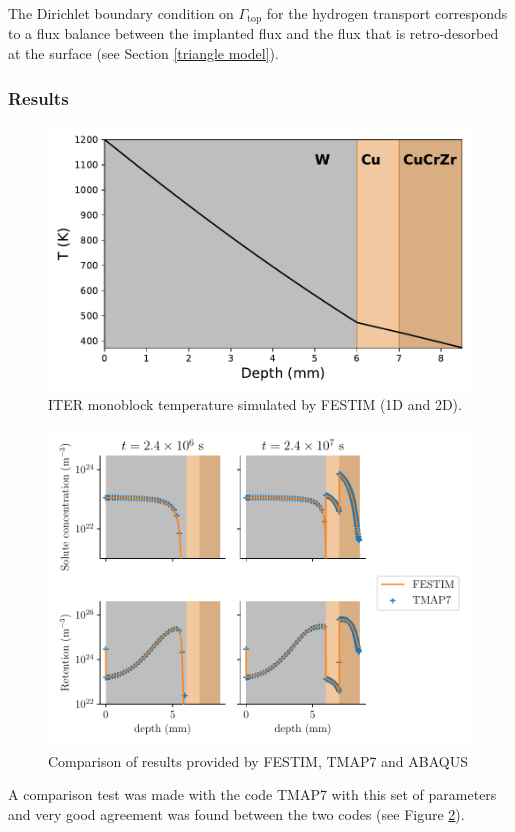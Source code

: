 The Dirichlet boundary condition on $\Gamma_\mathrm{top}$ for the hydrogen transport corresponds to a flux balance between the implanted flux and the flux that is retro-desorbed at the surface (see Section \ref{triangle model}).

\subsubsection{Results}

\begin{figure} [h]
    \centering
    \includegraphics[width=0.5\linewidth]{Figures/Chapter3/monoblocks/interface_condition/iter case/temperature_1D.pdf}
    \caption{ITER monoblock temperature simulated by FESTIM (1D and 2D).}
    \label{fig: temperature}
\end{figure}

\begin{figure} [h]
    \centering
    \includegraphics[width=\linewidth]{Figures/Chapter3/monoblocks/interface_condition/iter case/comparison_codes.pdf}
    \caption{Comparison of results provided by FESTIM, TMAP7 and ABAQUS}
    \label{fig: code comparison}
\end{figure}

A comparison test was made with the code TMAP7 with this set of parameters and very good agreement was found between the two codes (see Figure \ref{fig: code comparison}).
